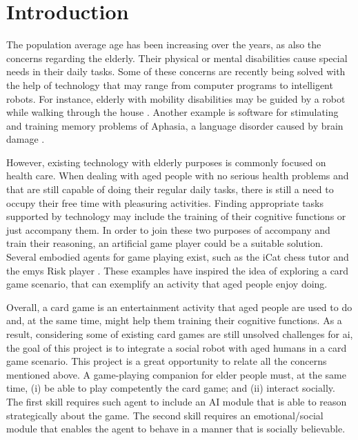 \section{Introduction} \label{introduction}

The population average age has been increasing over the years, as also the concerns regarding the elderly.
Their physical or mental disabilities cause special needs in their daily tasks.
Some of these concerns are recently being solved with the help of technology that may range from computer programs to intelligent robots.
For instance, elderly with mobility disabilities may be guided by a robot while walking through the house \cite{Pollack2002}.
Another example is software for stimulating and training memory problems of Aphasia, a language disorder caused by brain damage \cite{Pompili2011}.

However, existing technology with elderly purposes is commonly focused on health care.
When dealing with aged people with no serious health problems and that are still capable of doing their regular daily tasks, there is still a need to occupy their free time with pleasuring activities.
Finding appropriate tasks supported by technology may include the training of their cognitive functions or just accompany them.
In order to join these two purposes of accompany and train their reasoning, an artificial game player could be a suitable solution.
Several embodied agents for game playing exist, such as the iCat chess tutor \cite{Affective2007} and the \gls{emys} Risk player \cite{Pereira}.%
These examples have inspired the idea of exploring a card game scenario, that can exemplify an activity that aged people enjoy doing.

Overall, a card game is an entertainment activity that aged people are used to do and, at the same time, might help them training their cognitive functions.
As a result, considering some of existing card games are still unsolved challenges for \gls{ai}, the goal of this project is to integrate a social robot with aged humans in a card game scenario.
This project is a great opportunity to relate all the concerns mentioned above.
A game-playing companion for elder people must, at the same time, (i) be able to play competently the card game; and (ii) interact socially. The first skill requires such agent to include an AI module that is able to reason strategically about the game. The second skill requires an emotional/social module that enables the agent to behave in a manner that is socially believable.


